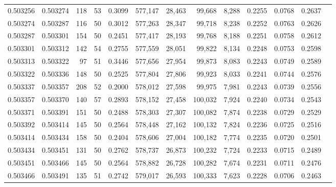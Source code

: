 \begin{tabular}{rrrrrrrrrrrrr}
0.503256 & 0.503274 & 118 &  53 &                                     0.3099 & 577,147 &  28,463 &  99,668 &   8,288 & 0.2255 & 0.0768 & 0.2637 \\
0.503274 & 0.503287 & 116 &  50 &                                     0.3012 & 577,263 &  28,347 &  99,718 &   8,238 & 0.2252 & 0.0763 & 0.2626 \\
0.503287 & 0.503301 & 154 &  50 &                                     0.2451 & 577,417 &  28,193 &  99,768 &   8,188 & 0.2251 & 0.0758 & 0.2612 \\
0.503301 & 0.503312 & 142 &  54 &                                     0.2755 & 577,559 &  28,051 &  99,822 &   8,134 & 0.2248 & 0.0753 & 0.2598 \\
0.503313 & 0.503322 &  97 &  51 &                                     0.3446 & 577,656 &  27,954 &  99,873 &   8,083 & 0.2243 & 0.0749 & 0.2589 \\
0.503322 & 0.503336 & 148 &  50 &                                     0.2525 & 577,804 &  27,806 &  99,923 &   8,033 & 0.2241 & 0.0744 & 0.2576 \\
0.503337 & 0.503357 & 208 &  52 &                                     0.2000 & 578,012 &  27,598 &  99,975 &   7,981 & 0.2243 & 0.0739 & 0.2556 \\
0.503357 & 0.503370 & 140 &  57 &                                     0.2893 & 578,152 &  27,458 & 100,032 &   7,924 & 0.2240 & 0.0734 & 0.2543 \\
0.503371 & 0.503391 & 151 &  50 &                                     0.2488 & 578,303 &  27,307 & 100,082 &   7,874 & 0.2238 & 0.0729 & 0.2529 \\
0.503392 & 0.503414 & 145 &  50 &                                     0.2564 & 578,448 &  27,162 & 100,132 &   7,824 & 0.2236 & 0.0725 & 0.2516 \\
0.503414 & 0.503434 & 158 &  50 &                                     0.2404 & 578,606 &  27,004 & 100,182 &   7,774 & 0.2235 & 0.0720 & 0.2501 \\
0.503434 & 0.503451 & 131 &  50 &                                     0.2762 & 578,737 &  26,873 & 100,232 &   7,724 & 0.2233 & 0.0715 & 0.2489 \\
0.503451 & 0.503466 & 145 &  50 &                                     0.2564 & 578,882 &  26,728 & 100,282 &   7,674 & 0.2231 & 0.0711 & 0.2476 \\
0.503466 & 0.503491 & 135 &  51 &                                     0.2742 & 579,017 &  26,593 & 100,333 &   7,623 & 0.2228 & 0.0706 & 0.2463 \\

\end{tabular}
